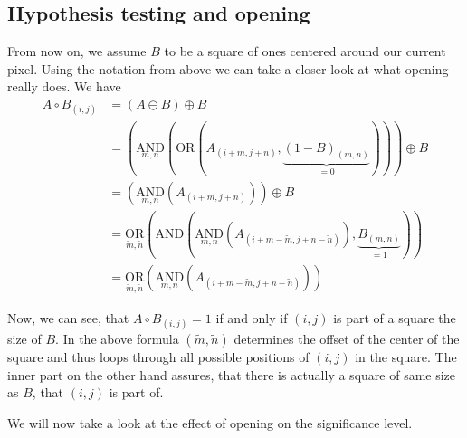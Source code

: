 \documentclass[a4paper,12pt]{article}
\theoremstyle{plain}
\theoremstyle{definition}
\theoremstyle{remark}
\begin{document}
\subsection{Hypothesis testing and opening}

From now on, we assume $B$ to be a square of ones centered around our current pixel. Using the notation from above we can take a closer look at what opening really does. We have
\begin{align*}
	A \circ B_{(i, j)} &= (A \ominus B) \oplus B \\
	&= ( \underset{m, n}{\mathrm{AND}} ( \mathrm{OR} (A_{(i + m, j + n)}, \underbrace{(1 - B)_{(m, n)}}_{= 0} ) ) ) \oplus B \\
	&= ( \underset{m, n}{\mathrm{AND}} ( A_{(i + m, j + n)} ) ) \oplus B \\
	&= \underset{\tilde{m}, \tilde{n}}{\mathrm{OR}} ( \mathrm{AND} (\underset{m, n}{\mathrm{AND}} ( A_{(i + m - \tilde{m}, j + n - \tilde{n})} ), \underbrace{B_{(m, n)}}_{= 1} ) ) \\
	&= \underset{\tilde{m}, \tilde{n}}{\mathrm{OR}} ( \underset{m, n}{\mathrm{AND}} ( A_{(i + m - \tilde{m}, j + n - \tilde{n})} ) )
\end{align*}

Now, we can see, that $A \circ B_{(i, j)} = 1$ if and only if $(i, j)$ is part of a square the size of $B$. In the above formula $(\tilde{m}, \tilde{n})$ determines the offset of the center of the square and thus loops through all possible positions of $(i, j)$ in the square. The inner part on the other hand assures, that there is actually a square of same size as $B$, that $(i, j)$ is part of.

We will now take a look at the effect of opening on the significance level.
\end{document}
